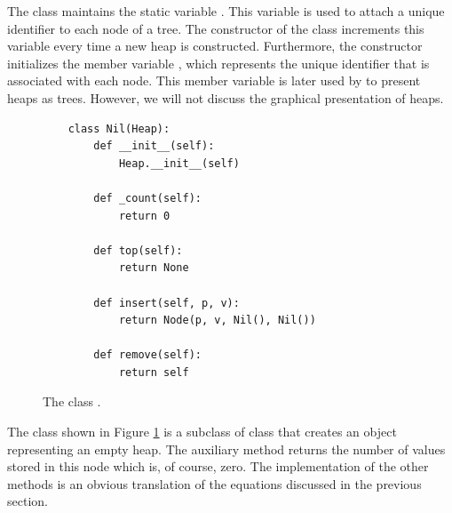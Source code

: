 The class  maintains the static variable .  This variable is used to attach a
unique identifier to each node of a tree.  The constructor of the class  increments this variable
every time a new heap is constructed.  Furthermore, the constructor initializes the member variable
, which represents the unique identifier that is associated with each node.  This member variable
is later used by  to present heaps as trees.  However, we will not discuss the graphical
presentation of heaps.

\begin{figure}[!ht]
\centering
\begin{verbatim}
    class Nil(Heap):
        def __init__(self):
            Heap.__init__(self)
    
        def _count(self):
            return 0

        def top(self):
            return None

        def insert(self, p, v):
            return Node(p, v, Nil(), Nil())   

        def remove(self):
            return self
\end{verbatim}
\vspace*{-0.3cm}
\caption{The class .}
\label{fig:Heap.ipynb:Nil}
\end{figure}

The class  shown in Figure \ref{fig:Heap.ipynb:Nil} is a subclass of class 
that creates an object representing an empty heap.
The auxiliary method  returns the number of values stored in this node which is, of course,
zero.  The implementation of the other methods is an obvious translation of the equations discussed in the
previous section.


